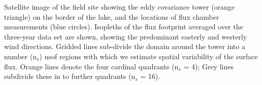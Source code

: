\label{fig:fp_on_map_Stordalen} Satellite image of the field
site showing the eddy covariance tower (orange triangle) on the border
of the lake, and the locations of flux chamber measurements (blue
circles). Isopleths of the flux footprint averaged over the three-year
data set are shown, showing the predominant easterly and westerly wind
directions. Gridded lines sub-divide the domain around the tower into a
number (n\(_s\)) nsof regions with which we estimate spatial variability of
the surface flux. Orange lines denote the four cardinal quadrants
(n\(_s\) = 4); Grey lines subdivide these in to further quadrants
(n\(_s\) = 16).